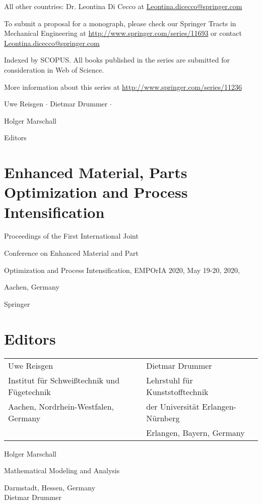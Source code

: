 \documentclass[10pt]{article}
\begin{document}
All other countries: Dr. Leontina Di Cecco at \href{mailto:Leontina.dicecco@springer.com}{Leontina.dicecco@springer.com}

To submit a proposal for a monograph, please check our Springer Tracts in Mechanical Engineering at \href{http://www.springer.com/series/11693}{http://www.springer.com/series/11693} or contact \href{mailto:Leontina.dicecco@springer.com}{Leontina.dicecco@springer.com}

Indexed by SCOPUS. All books published in the series are submitted for consideration in Web of Science.

More information about this series at \href{http://www.springer.com/series/11236}{http://www.springer.com/series/11236}

Uwe Reisgen $\cdot$ Dietmar Drummer $\cdot$

Holger Marschall

Editors

\section*{Enhanced Material, Parts Optimization and Process Intensification}
Proceedings of the First International Joint

Conference on Enhanced Material and Part

Optimization and Process Intensification, EMPOrIA 2020, May 19-20, 2020,

Aachen, Germany

Springer

\section*{Editors}
\begin{center}
\begin{tabular}{ll}
Uwe Reisgen & Dietmar Drummer \\
Institut für Schweißtechnik und Fügetechnik & Lehrstuhl für Kunststofftechnik \\
Aachen, Nordrhein-Westfalen, Germany & der Universität Erlangen-Nürnberg \\
 & Erlangen, Bayern, Germany \\
\end{tabular}
\end{center}

Holger Marschall

Mathematical Modeling and Analysis

Darmstadt, Hessen, Germany\\
Dietmar Drummer
\end{document}
